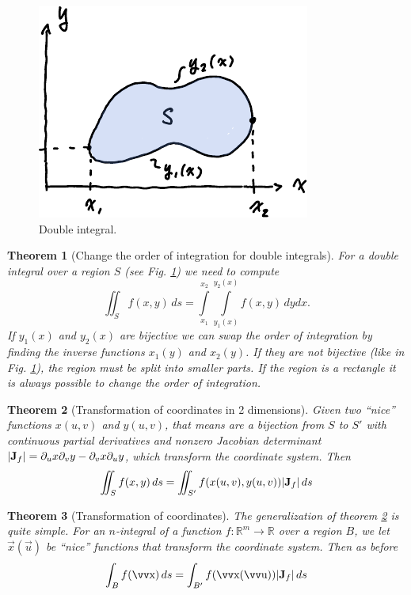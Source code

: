 \documentclass[twocolumn, margin=normal]{tex/hsrzf}
\theoremstyle{fuvarzf}
\newtheorem{theorem}{Theorem}
\begin{document}
\begin{figure}
  \centering
  \includegraphics{img/double-integral}
  \caption{
    Double integral.
    \label{fig:double-integral}
  }
\end{figure}

\begin{theorem}[Change the order of integration for double integrals] For a
  double integral over a region \(S\) (see Fig.  \ref{fig:double-integral}) we
  need to compute
  \[
    \iint_S f(x,y) \,ds =
      \int\limits_{x_1}^{x_2} \int\limits_{y_1(x)}^{y_2(x)} f(x,y) \,dydx .
  \]
  If \(y_1(x)\) and \(y_2(x)\) are bijective we can swap the order of
  integration by finding the inverse functions \(x_1(y)\) and \(x_2(y)\). If
  they are not bijective (like in Fig. \ref{fig:double-integral}), the region
  must be split into smaller parts. If the region is a rectangle it is always
  possible to change the order of integration.
\end{theorem}

\begin{theorem}[Transformation of coordinates in 2 dimensions]
  \label{thm:transform-coords}
  Given two ``nice'' functions \(x(u,v)\) and \(y(u,v)\), that means are a
  bijection from \(S\) to \(S'\) with continuous partial derivatives and
  nonzero Jacobian determinant \(|\bm{\mathrm{J}}_f| = \partial_u x \partial_v y -
  \partial_v x \partial_u y\), which transform the coordinate system. Then
  \[
    \iint_S f(x,y) \,ds = \iint_{S'} f(x(u,v), y(u,v)) |\bm{\mathrm{J}}_f| \,ds
  \]
\end{theorem}

\begin{theorem}[Transformation of coordinates]
  The generalization of theorem \ref{thm:transform-coords} is quite simple.
  For an \(n\)-integral of a function \(f:\mathbb{R}^m\to\mathbb{R}\) over a
  region \(B\), we let \(\vec{x}(\vec{u})\) be ``nice'' functions that
  transform the coordinate system. Then as before
  \[
    \int_B f(\vec{x}) \,ds = \int_{B'} f(\vec{x}(\vec{u})) |\mx{J}_f| \,ds
  \]
\end{theorem}
\end{document}
